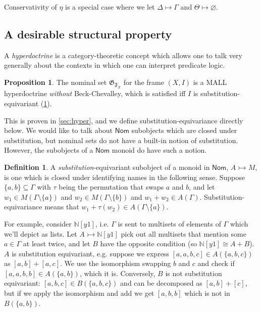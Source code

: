 \documentclass{article}
\theoremstyle{definition}
\newtheorem{definition}{Definition}[section]
\newtheorem{proposition}{Proposition}[section]
\newcommand{\N}{\mathbb{N}}
\newcommand{\F}{\mathfrak{F}}
\newcommand{\G}{\mathfrak{G}}
\newcommand{\cat}[1]{\mathsf{#1}}
\begin{document}
{    Conservativity of $\eta$ is a special case where we let $\Delta\mapsto \Gamma$ and $\Theta\mapsto \varnothing$.
}


\subsection{A desirable structural property}

A {\it hyperdoctrine} is a category-theoretic concept which allows one to talk very generally about the contexts in which one can interpret predicate logic.

\begin{proposition}
\label{prop:hyper}
The nominal set $\G_{\F_X}$ for the frame $(X,I)$ is a MALL hyperdoctrine {\it without} Beck-Chevalley, which is satisfied iff $I$ is substitution-equivariant (\cref{def:substeq}).
\end{proposition}

This is proven in \cref{sec:hyper}, and we define substitution-equivariance directly below.
We would like to talk about $\cat{Nom}$ subobjects which are closed under substitution, but nominal sets do not have a built-in notion of substitution. 
However, the subobjects of a $\cat{Nom}$ monoid do have such a notion.

\begin{definition}
\label{def:substeq}
A {\it substitution}-equivariant subobject of a monoid in $\cat{Nom}$, $A \rightarrowtail M$, is one which is closed under identifying names in the following sense. 
Suppose $\{a,b\}\subseteq \Gamma$ with $\tau$ being the permutation that swaps $a$ and $b$, and let $w_1 \in M(\Gamma\setminus\{a\})$ and $w_2 \in M(\Gamma\setminus\{b\})$ and $w_1+w_2 \in A(\Gamma)$. 
Substitution-equivariance means that $w_1 +\tau(w_2) \in A(\Gamma\setminus\{a\})$.
\end{definition}

For example, consider $\N[y1]$, i.e. $\Gamma$ is sent to multisets of elements of $\Gamma$ which we'll depict as lists. Let $A\rightarrowtail \N[y1]$ pick out all multisets that mention some $a \in \Gamma$ at least twice, and let $B$ have the opposite condition (so $\N[y1]\cong A+B$). $A$ is substitution equivariant, e.g. suppose we express $[a,a,b,c]\in A(\{a,b,c\})$ as $[a,b]+[a,c]$. We use the isomorphism swapping $b$ and $c$ and check if $[a,a,b,b] \in A(\{a,b\})$, which it is. Conversely, $B$ is not substitution equivariant: $[a,b,c] \in B(\{a,b,c\})$ and can be decomposed as $[a,b]+[c]$, but if we apply the isomorphism and add we get $[a,b,b]$ which is not in $B(\{a,b\})$. 
\end{document}
